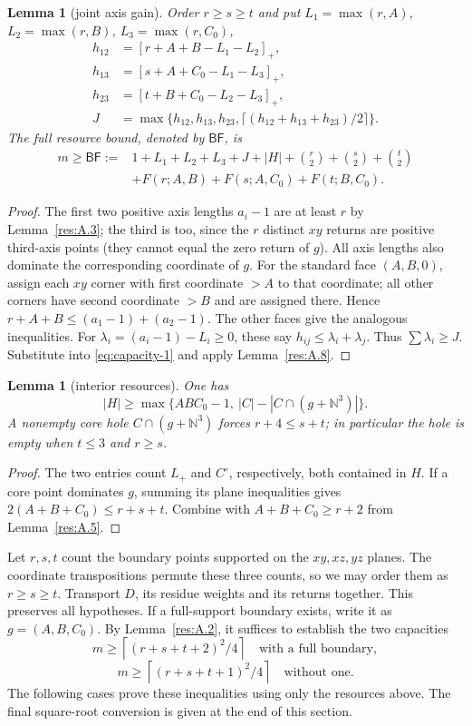 \documentclass[11pt]{article}
\newtheorem{lemma}[theorem]{Lemma}
\theoremstyle{definition}
\theoremstyle{remark}
\theoremstyle{plain}
\begin{document}
\begin{lemma}[joint axis gain]\label{res:A.9}
Order $r\ge s\ge t$ and put
$L_1=\max(r,A)$, $L_2=\max(r,B)$, $L_3=\max(r,C_0)$,
\[
\begin{split}
 h_{12}&=[r+A+B-L_1-L_2]_+,\\
 h_{13}&=[s+A+C_0-L_1-L_3]_+,\\
 h_{23}&=[t+B+C_0-L_2-L_3]_+,\\
 J&=\max\{h_{12},h_{13},h_{23},
               \lceil(h_{12}+h_{13}+h_{23})/2\rceil\}.
\end{split}
\]
The full resource bound, denoted by $\mathsf{BF}$, is
\[
\begin{split}
 m\ge\mathsf{BF}:={}&1+L_1+L_2+L_3+J+|H|
       +\binom r2+\binom s2+\binom t2\\
 &+F(r;A,B)+F(s;A,C_0)+F(t;B,C_0).
\end{split}\tag{3.6}\label{eq:capacity-6}
\]
\end{lemma}
\begin{proof}
The first two positive axis lengths $a_i-1$ are at least $r$ by Lemma~\ref{res:A.3};
the third is too, since the $r$ distinct $xy$ returns are positive
third-axis points (they cannot equal the zero return of $g$).
All axis lengths also dominate the corresponding coordinate of $g$.
For the standard face $(A,B,0)$, assign each $xy$ corner with first
coordinate $>A$ to that coordinate; all other corners have second
coordinate $>B$ and are assigned there. Hence
$r+A+B\le(a_1-1)+(a_2-1)$.
The other faces give the analogous inequalities. For
$\lambda_i=(a_i-1)-L_i\ge0$, these say $h_{ij}\le \lambda_i+\lambda_j$.
Thus $\sum \lambda_i\ge J$. Substitute into \eqref{eq:capacity-1} and apply Lemma~\ref{res:A.8}.
\end{proof}

\begin{lemma}[interior resources]\label{res:A.10}
One has
\[
 |H|\ge\max\{ABC_0-1,\ |C|-|C\cap(g+\mathbb N^3)|\}.
\]
A nonempty core hole $C\cap(g+\mathbb N^3)$ forces $r+4\le s+t$;
in particular the hole is empty when $t\le3$ and $r\ge s$.
\end{lemma}
\begin{proof}
The two entries count $L_+$ and $C^\circ$, respectively, both contained
in $H$. If a core point dominates $g$, summing its plane inequalities
gives $2(A+B+C_0)\le r+s+t$. Combine with $A+B+C_0\ge r+2$ from Lemma~\ref{res:A.5}.
\end{proof}

Let $r,s,t$ count the boundary points supported on the $xy,xz,yz$
planes. The coordinate transpositions permute these three counts, so
we may order them as $r\ge s\ge t$. Transport $D$, its residue weights
and its returns together. This preserves all hypotheses.
If a full-support boundary exists, write it as $g=(A,B,C_0)$.
By Lemma~\ref{res:A.2}, it suffices to establish the two capacities
\[
m\ge\left\lceil(r+s+t+2)^2/4\right\rceil
\quad\text{with a full boundary},\tag{3.7}\label{eq:capacity-7}
\]
\[
m\ge\left\lceil(r+s+t+1)^2/4\right\rceil
\quad\text{without one}.\tag{3.8}\label{eq:capacity-8}
\]
The following cases prove these inequalities using only the resources
above. The final square-root conversion is given at the end of this section.
\end{document}
